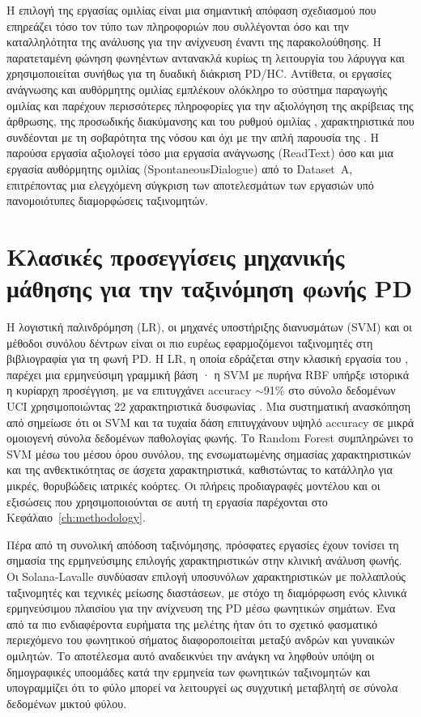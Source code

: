 Η επιλογή της εργασίας ομιλίας είναι μια σημαντική απόφαση σχεδιασμού που επηρεάζει τόσο τον τύπο των πληροφοριών που συλλέγονται όσο και την καταλληλότητα της ανάλυσης για την ανίχνευση έναντι της παρακολούθησης. Η παρατεταμένη φώνηση φωνηέντων αντανακλά κυρίως τη λειτουργία του λάρυγγα και χρησιμοποιείται συνήθως για τη δυαδική διάκριση PD/HC. Αντίθετα, οι εργασίες ανάγνωσης και αυθόρμητης ομιλίας εμπλέκουν ολόκληρο το σύστημα παραγωγής ομιλίας και παρέχουν περισσότερες πληροφορίες για την αξιολόγηση της ακρίβειας της άρθρωσης, της προσωδικής διακύμανσης και του ρυθμού ομιλίας , χαρακτηριστικά που συνδέονται με τη σοβαρότητα της νόσου και όχι με την απλή παρουσία της \citep{wright2025vocal}. Η παρούσα εργασία αξιολογεί τόσο μια εργασία ανάγνωσης (ReadText) όσο και μια εργασία αυθόρμητης ομιλίας (SpontaneousDialogue) από το Dataset~A, επιτρέποντας μια ελεγχόμενη σύγκριση των αποτελεσμάτων των εργασιών υπό πανομοιότυπες διαμορφώσεις ταξινομητών.

\section{Κλασικές προσεγγίσεις μηχανικής μάθησης για την ταξινόμηση φωνής PD}

Η λογιστική παλινδρόμηση (LR), οι μηχανές υποστήριξης διανυσμάτων (SVM) και οι μέθοδοι συνόλου δέντρων είναι οι πιο ευρέως εφαρμοζόμενοι ταξινομητές στη βιβλιογραφία για τη φωνή PD. Η LR, η οποία εδράζεται στην κλασική εργασία του \citet{cox1958regression}, παρέχει μια ερμηνεύσιμη γραμμική βάση \citep{bishop2006pattern,hosmer2013applied_logistic_regression}· η SVM με πυρήνα RBF υπήρξε ιστορικά η κυρίαρχη προσέγγιση, με \citet{little2009suitability} να επιτυγχάνει accuracy $\sim$91\% στο σύνολο δεδομένων UCI χρησιμοποιώντας 22 χαρακτηριστικά δυσφωνίας \citep{cortes1995support}. Μια συστηματική ανασκόπηση από \citet{saenz2014methodological} σημείωσε ότι οι SVM και τα τυχαία δάση επιτυγχάνουν υψηλό accuracy σε μικρά ομοιογενή σύνολα δεδομένων παθολογίας φωνής. Το Random Forest \citep{breiman2001random} συμπληρώνει το SVM μέσω του μέσου όρου συνόλου, της ενσωματωμένης σημασίας χαρακτηριστικών και της ανθεκτικότητας σε άσχετα χαρακτηριστικά, καθιστώντας το κατάλληλο για μικρές, θορυβώδεις ιατρικές κοόρτες. Οι πλήρεις προδιαγραφές μοντέλου και οι εξισώσεις που χρησιμοποιούνται σε αυτή τη εργασία παρέχονται στο Κεφάλαιο~\ref{ch:methodology}.

Πέρα από τη συνολική απόδοση ταξινόμησης, πρόσφατες εργασίες έχουν τονίσει τη σημασία της ερμηνεύσιμης επιλογής χαρακτηριστικών στην κλινική ανάλυση φωνής. 
Οι Solana-Lavalle \citet{solana_lavalle2021analysis} συνδύασαν επιλογή υποσυνόλων χαρακτηριστικών με πολλαπλούς ταξινομητές και τεχνικές μείωσης διαστάσεων, 
με στόχο τη διαμόρφωση ενός κλινικά ερμηνεύσιμου πλαισίου για την ανίχνευση της PD μέσω φωνητικών σημάτων.
Ένα από τα πιο ενδιαφέροντα ευρήματα της μελέτης ήταν ότι το σχετικό φασματικό περιεχόμενο του φωνητικού σήματος διαφοροποιείται μεταξύ ανδρών και γυναικών ομιλητών.
Το αποτέλεσμα αυτό αναδεικνύει την ανάγκη να ληφθούν υπόψη οι δημογραφικές υποομάδες κατά την ερμηνεία των φωνητικών ταξινομητών και υπογραμμίζει ότι το φύλο μπορεί να λειτουργεί ως συγχυτική μεταβλητή σε σύνολα δεδομένων μικτού φύλου.

